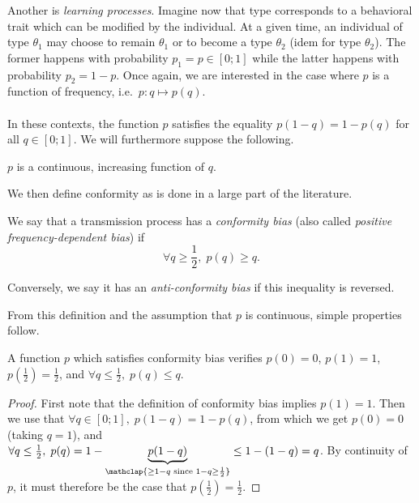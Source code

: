 \documentclass[12pt,a4paper]{article}		%
\begin{document}
Another is \emph{learning processes}. Imagine now that type corresponds to a behavioral trait which can be modified by the individual. At a given time, an individual of type $\theta_1$ may choose to remain $\theta_1$ or to become a type $\theta_2$ (idem for type $\theta_2$). The former happens with probability $p_1 = p \in [0;1]$ while the latter happens with probability $p_2 = 1 - p$. Once again, we are interested in the case where $p$ is a function of frequency, i.e.\ $p : q \mapsto p(q)$.

\paragraph{}
In these contexts, the function $p$ satisfies the equality $p(1 - q) = 1 - p(q)$ for all $q \in [0;1]$. We will furthermore suppose the following.

\begin{rev-ass} $p$ is a continuous, increasing function of $q$.
\end{rev-ass}

We then define conformity as is done in a large part of the literature.

\begin{rev-def} We say that a transmission process has a \emph{conformity bias} (also called \emph{positive frequency-dependent bias}) if
		\[ \forall q \geq \frac{1}{2}, \; p(q) \geq q. \]

	Conversely, we say it has an \emph{anti-conformity bias} if this inequality is reversed.
\end{rev-def}

From this definition and the assumption that $p$ is continuous, simple properties follow.

\begin{rev-cons} A function $p$ which satisfies conformity bias verifies $p(0) = 0$, $p(1) = 1$, $p(\frac{1}{2}) = \frac{1}{2}$, and $\forall q \leq \frac{1}{2}, \; p(q) \leq q$.
\end{rev-cons}

\begin{proof} \small \color{gray} First note that the definition of conformity bias implies $p(1) = 1$. Then we use that $\forall q \in [0; 1], \; p(1 - q) = 1 - p(q)$, from which we get $p(0) = 0$ (taking $q = 1$), and $\forall q \leq \frac{1}{2}, \; p(q) = 1 - \underbrace{p(1 - q)}_{\mathclap{\geq 1 - q \text{ since } 1 - q \geq \frac{1}{2}}} \leq 1 - (1-q) = q$. By continuity of $p$, it must therefore be the case that $p(\frac{1}{2}) = \frac{1}{2}$.
\end{proof}
\end{document}
